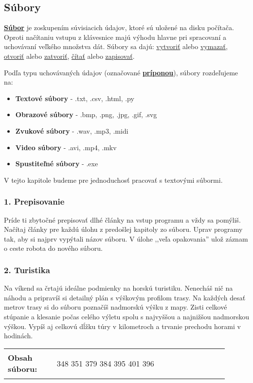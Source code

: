 \subsection{Súbory}
\underline{\textbf{Súbor}} je zoskupením súvisiacich údajov, ktoré sú uložené na disku počítača. Oproti načítaniu vstupu z klávesnice majú výhodu hlavne pri spracovaní a uchovávaní veľkého množstva dát. Súbory sa dajú: \underline{vytvoriť} alebo \underline{vymazať}, \underline{otvoriť} alebo \underline{zatvoriť}, \underline{čítať} alebo \underline{zapisovať}.

Podľa typu uchovávaných údajov (označované \underline{\textbf{príponou}}), súbory rozdeľujeme na:
\begin{itemize}[noitemsep]
\item \textbf{Textové súbory} - .txt, .csv, .html, .py
\item \textbf{Obrazové súbory} - .bmp, .png, .jpg, .gif, .svg
\item \textbf{Zvukové súbory} - .wav, .mp3, .midi
\item \textbf{Video súbory} - .avi, .mp4, .mkv
\item \textbf{Spustiteľné súbory} - .exe
\end{itemize}
V tejto kapitole budeme pre jednoduchosť pracovať s textovými súbormi.

\subsubsection*{1. Prepisovanie}
Príde ti zbytočné prepisovať dlhé články na vstup programu a vždy sa pomýliš. Načítaj články pre každú úlohu z predošlej kapitoly zo súboru. Uprav programy tak, aby si najprv vypýtali názov súboru. V úlohe ,,veľa opakovania'' ulož záznam o ceste robota do nového súboru.


\subsubsection*{2. Turistika}
Na víkend sa črtajú ideálne podmienky na horskú turistiku. Nenecháš nič na náhodu a pripravíš si detailný plán s výškovým profilom trasy. Na každých desať metrov trasy si do súboru poznačíš nadmorskú výšku z mapy. Zisti celkové stúpanie a klesanie počas celého výletu spolu s najvyššou a najnižšou nadmorskou výškou. Vypíš aj celkovú dĺžku túry v kilometroch a trvanie prechodu horami v hodinách.

\begin{tabular}{@{}p{0.2\linewidth}p{0.7\linewidth}}
\textbf{\small Obsah súboru:} &
\vspace{-3em}
\begin{code}
348
351
379
384
395
401
396
\end{code}
\end{tabular}


